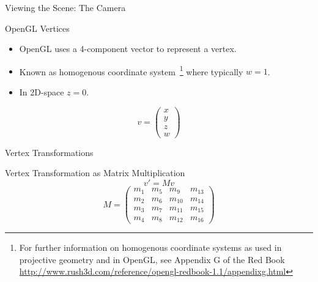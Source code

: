 \documentclass[xcolor=dvipsnames,t]{beamer}
\begin{document}
\begin{frame}{Viewing the Scene: The Camera}
\end{frame} 

\begin{frame}{OpenGL Vertices} 
    \begin{itemize}
        \item OpenGL uses a 4-component vector to represent a vertex.
        \item Known as homogenous coordinate system~\footnote{For 
            further information on homogenous coordinate systems as 
            used in projective geometry and in OpenGL, see Appendix G of the Red Book
            \url{http://www.rush3d.com/reference/opengl-redbook-1.1/appendixg.html} } 
            where typically $w=1$.
        \item In 2D-space $z=0$.
    \end{itemize} 
    \begin{equation*}
        v = \left( 
                \begin{array}{c}
                x \\
                y \\
                z \\
                w
                \end{array}
            \right)
    \end{equation*} 
\end{frame} 

\begin{frame}{Vertex Transformations} 
\end{frame} 

\begin{frame}{Vertex Transformation as Matrix Multiplication} 
    \begin{equation*}
        v' = M v
    \end{equation*} 
    \vspace{1cm} 
    \begin{equation*} 
        M = \left(
                \begin{array}{cccc}
                    m_{1}   & m_{5}     & m_{9}     & m_{13} \\
                    m_{2}   & m_{6}     & m_{10}    & m_{14} \\
                    m_{3}   & m_{7}     & m_{11}    & m_{15} \\
                    m_{4}   & m_{8}     & m_{12}    & m_{16} 
                \end{array} 
            \right)
    \end{equation*} 
\end{frame} 
\end{document}
